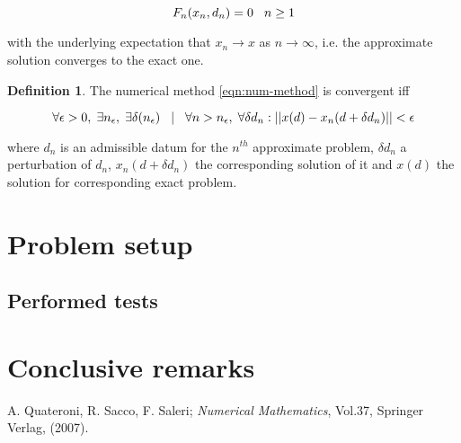 \documentclass{article}
\theoremstyle{theorem}
\theoremstyle{definition}
\newtheorem{definition}{Definition}
\begin{document}
\begin{equation}
	\label{eqn:num-method}
	F_n(x_n, d_n) = 0 \hspace{3mm} n\ge 1
\end{equation}

with the underlying expectation that $x_n\rightarrow x$ as $n\rightarrow\infty$, i.e. the approximate solution converges to the exact one. 

\begin{definition}
The numerical method \ref{eqn:num-method} is convergent iff

$$\forall\epsilon >0,\hspace{1mm} \exists n_\epsilon,\hspace{1mm} \exists\delta(n_\epsilon)\hspace{3mm} | \hspace{3mm}\forall n > n_\epsilon,\hspace{1mm} \forall\delta d_n : ||x(d)-x_n(d+\delta d_n)||<\epsilon$$

where $d_n$ is an admissible datum for the $n^{th}$ approximate problem, $\delta d_n$ a perturbation of $d_n$, $x_n(d+\delta d_n)$ the corresponding solution of it and $x(d)$ the solution for corresponding
 exact problem.
\end{definition}



\section{Problem setup}
\subsection{Performed tests}

\section{Conclusive remarks}


\cleardoublepage
\begin{thebibliography}{99}

 A. Quateroni, R. Sacco, F. Saleri;
\emph{Numerical Mathematics}, Vol.37, Springer Verlag, (2007).







\printindex
\end{thebibliography}
\end{document}
